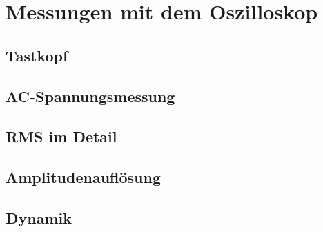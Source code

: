 \documentclass[a4paper]{article}
\begin{document}
\section{Messungen mit dem Oszilloskop}
\subsection{Tastkopf}
\subsection{AC-Spannungsmessung}
\subsection{RMS im Detail}
\subsection{Amplitudenauflösung}
\subsection{Dynamik}
\end{document}
